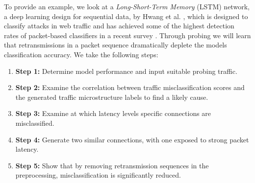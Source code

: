 \documentclass[runningheads]{llncs}
\begin{document}
To provide an example, we look at a \textit{Long-Short-Term Memory} (LSTM) network, a deep learning design for sequential data, by Hwang et al. \cite{hwang2019lstm}, which is designed to classify attacks in web traffic and has achieved some of the highest detection rates of packet-based classifiers in a recent survey \cite{tahaei2020rise}. Through probing we will learn that retransmissions in a packet sequence dramatically deplete the models classification accuracy. We take the following steps:

\begin{enumerate}
\item [] \textbf{Step 1:} Determine model performance and input suitable probing traffic.
\item [] \textbf{Step 2:} Examine the correlation between traffic misclassification scores and the generated traffic microstructure labels to find a likely cause.%
\item [] \textbf{Step 3:} Examine at which latency levels specific connections are misclassified.

\item [] \textbf{Step 4:} Generate two similar connections, with one exposed to strong packet latency.%
\item [] \textbf{Step 5:} Show that by removing retransmission sequences in the preprocessing, misclassification is significantly reduced.
\end{enumerate}







\end{document}
